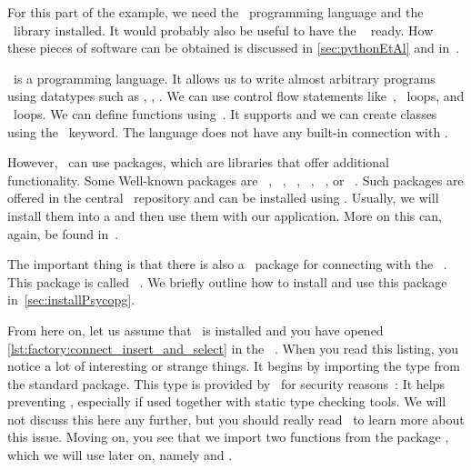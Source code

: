 For this part of the example, we need the \python\ programming language and the \psycopg~library installed.
It would probably also be useful to have the \pycharm\  ready.
How these pieces of software can be obtained is discussed in \cref{sec:pythonEtAl} and in~\cite{programmingWithPython}.

\python\ is a programming language.
It allows us to write almost arbitrary programs using datatypes such as , , .
We can use control flow statements like~, ~loops, and ~loops.
We can define functions using~.
It supports  and we can create classes using the ~keyword.
The language does not have any built-in connection with \postgresql.

However, \python\ can use packages, which are libraries that offer additional functionality.
Some Well-known packages are \numpy~\cite{HMvdWGVCWTBSKPHvKBHFdRWPGMSRWAGO2020APWN,N2025N,DBvR2024ITN,J2018NPSCADSAWNSAM}, \pandas~\cite{PD2025P,B2012DPWP,L2024PW}, \scikitlearn~\cite{PVGMTGBPWDVPCBPD2011SMLIP,RLM2022MLWPAS}, \scipy~\cite{VGOHRCBPWBvdWBWMMNJKLCPFMVLPCHQHARPvMS2020SFAFSCIP,J2018NPSCADSAWNSAM}, \tensorflow~\cite{ABCCDDDGIIKLMMMSTVWWYZ2016TASFLSML,L2023TDDBTADMLMWT}, or \pytorch~\cite{PGMLBCKLGADKYDRTCSFBC2019PAISHPDLL,RLM2022MLWPAS}.
Such packages are offered in the central \pypi\ repository and can be installed using \pip.
Usually, we will install them into a  and then use them with our application.
More on this can, again, be found in~\cite{programmingWithPython}.

The important thing is that there is also a \python\ package for connecting with the \postgresql\ \dbms.
This package is called \psycopg~\cite{VDGE2010P}.
We briefly outline how to install and use this package in~\cref{sec:installPsycopg}.

%

From here on, let us assume that \psycopg\ is installed and you have opened \cref{lst:factory:connect_insert_and_select} in the \pycharm\ .
When you read this listing, you notice a lot of interesting or strange things.
It begins by importing the type  from the standard  package.
This type is provided by \python\ for security reasons~\cite{PEP675}:
It helps preventing , especially if used together with static type checking tools.
We will not discuss this here any further, but you should really read~\cite{PEP675,VDGE2022PPDAFP:ST} to learn more about this issue.
Moving on, you see that we import two functions from the package \psycopg, which we will use later on, namely  and .

